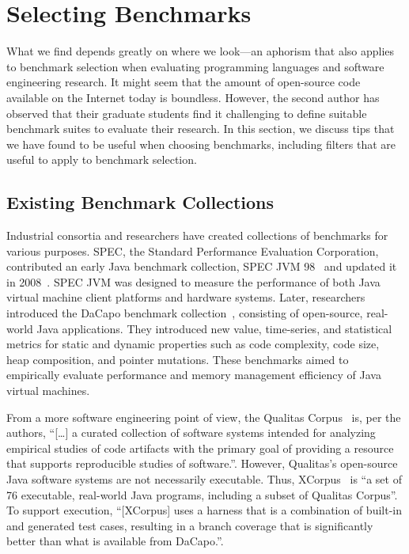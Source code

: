 \section{Selecting Benchmarks}
\label{sec:selecting-benchmarks}
What we find depends greatly on where we look---an aphorism that also applies to benchmark selection when evaluating programming languages and software engineering research. 
It might seem that the amount of open-source code available on the Internet today is boundless. However, the second author has observed that their graduate students find it challenging to define suitable benchmark suites to evaluate their research. 
In this section, we discuss tips that we have found to be useful when choosing benchmarks, including filters that are useful to apply to benchmark selection.

\subsection{Existing Benchmark Collections}
Industrial consortia and researchers have created collections of benchmarks for various purposes. SPEC, the Standard Performance Evaluation Corporation, contributed an early Java benchmark collection, SPEC JVM 98~\cite{SPECjvm98} and updated it in 2008~\cite{SPECjvm2008}. SPEC JVM was designed to measure the performance of both Java virtual machine client platforms and hardware systems. Later, researchers introduced the DaCapo benchmark collection~\cite{DaCapo_inproceedings}, consisting of open-source, real-world Java applications. 
They introduced new value, time-series, and statistical metrics for static and dynamic properties such as code complexity, code size, heap composition, and pointer mutations. These benchmarks aimed to empirically evaluate performance and memory management efficiency of Java virtual machines.

From a more software engineering point of view, the Qualitas Corpus~\cite{QualitasCorpus} is, per the authors, ``[\ldots] a curated collection of software systems intended for analyzing empirical studies of code artifacts with the primary goal of providing a resource that supports reproducible studies of software.''. However, Qualitas's open-source Java software systems are not necessarily executable. Thus, XCorpus~\cite{XCorpus} is ``a set of 76 executable, real-world Java programs, including a subset of Qualitas Corpus''. To support execution, ``[XCorpus] uses a harness that is a combination of built-in and generated test cases, resulting in a branch coverage that is significantly better than what is available from DaCapo.''.

